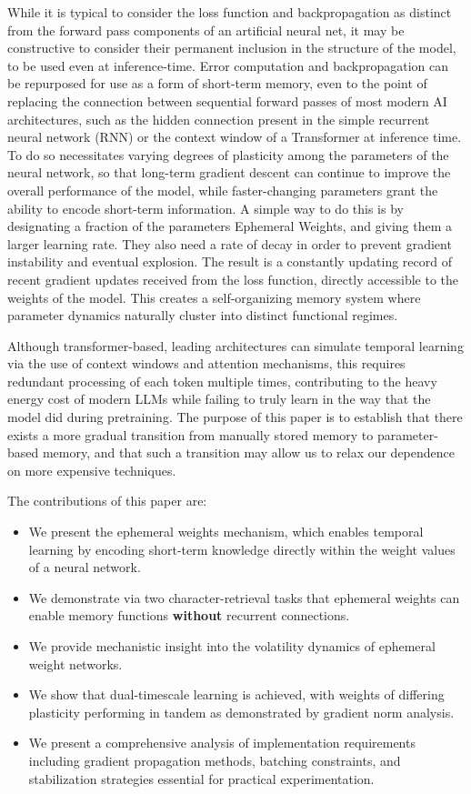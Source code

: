 While it is typical to consider the loss function and backpropagation as distinct from the forward pass components of an artificial neural net, it may be constructive to consider their permanent inclusion in the structure of the model, to be used even at inference-time. Error computation and backpropagation can be repurposed for use as a form of short-term memory, even to the point of replacing the connection between sequential forward passes of most modern AI architectures, such as the hidden connection present in the simple recurrent neural network (RNN) or the context window of a Transformer at inference time. To do so necessitates varying degrees of plasticity among the parameters of the neural network, so that long-term gradient descent can continue to improve the overall performance of the model, while faster-changing parameters grant the ability to encode short-term information. A simple way to do this is by designating a fraction of the parameters Ephemeral Weights, and giving them a larger learning rate. They also need a rate of decay in order to prevent gradient instability and eventual explosion. The result is a constantly updating record of recent gradient updates received from the loss function, directly accessible to the weights of the model. This creates a self-organizing memory system where parameter dynamics naturally cluster into distinct functional regimes.

Although transformer-based, leading architectures can simulate temporal learning via the use of context windows and attention mechanisms, this requires redundant processing of each token multiple times, contributing to the heavy energy cost of modern LLMs while failing to truly learn in the way that the model did during pretraining. The purpose of this paper is to establish that there exists a more gradual transition from manually stored memory to parameter-based memory, and that such a transition may allow us to relax our dependence on more expensive techniques.

The contributions of this paper are: 
\begin{itemize}
\item We present the ephemeral weights mechanism, which enables temporal learning by encoding short-term knowledge directly within the weight values of a neural network.
\item We demonstrate via two character-retrieval tasks that ephemeral weights can enable memory functions \textbf{without} recurrent connections.
\item We provide mechanistic insight into the volatility dynamics of ephemeral weight networks.
\item We show that dual-timescale learning is achieved, with weights of differing plasticity performing in tandem as demonstrated by gradient norm analysis.
\item We present a comprehensive analysis of implementation requirements including gradient propagation methods, batching constraints, and stabilization strategies essential for practical experimentation.
\end{itemize}

